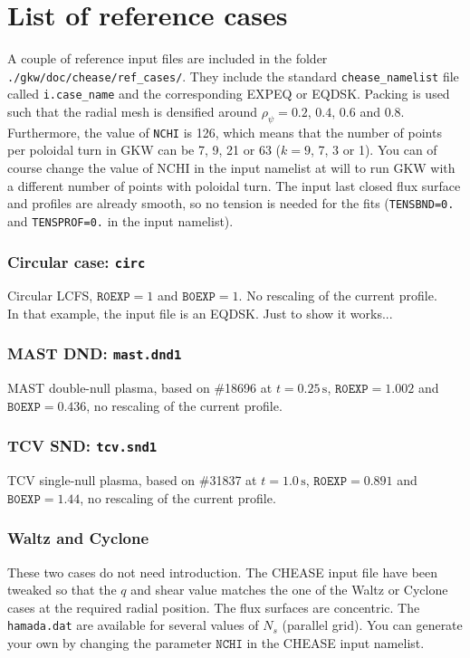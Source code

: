 \documentclass[a4paper,12pt]{article}
\begin{document}
\part*{List of reference cases}
A couple of reference input files are included in the folder \texttt{./gkw/doc/chease/ref\_cases/}. They include the standard \texttt{chease\_namelist} file called \texttt{i.case\_name} and the corresponding EXPEQ or EQDSK. Packing is used such that the radial mesh is densified around $\rho_\psi=0.2$, $0.4$, $0.6$ and $0.8$. Furthermore, the value of \texttt{NCHI} is 126, which means that the number of points per poloidal turn in GKW can be 7, 9, 21 or 63 ($k=9$, 7, 3 or 1). You can of course change the value of NCHI in the input namelist at will to run GKW with a different number of points with poloidal turn. The input last closed flux surface and profiles are already smooth, so no tension is needed for the fits (\texttt{TENSBND=0.} and \texttt{TENSPROF=0.} in the input namelist).

\section{Circular case: \texttt{circ}}
Circular LCFS, $\texttt{R0EXP}=1$ and $\texttt{B0EXP}=1$. No rescaling of the current profile.\\
In that example, the input file is an EQDSK. Just to show it works...

\section{MAST DND: \texttt{mast.dnd1}}
MAST double-null plasma, based on \#18696 at $t=0.25\,\textrm{s}$, $\texttt{R0EXP}=1.002$ and $\texttt{B0EXP}=0.436$, no rescaling of the current profile.

\section{TCV SND: \texttt{tcv.snd1}}
TCV single-null plasma, based on \#31837 at $t=1.0\,\textrm{s}$, $\texttt{R0EXP}=0.891$ and $\texttt{B0EXP}=1.44$, no rescaling of the current profile.

\section{Waltz and Cyclone}
These two cases do not need introduction. The CHEASE input file have been tweaked so that the $q$ and shear value matches the one of the Waltz or Cyclone cases at the required radial position. The
flux surfaces are concentric. The \texttt{hamada.dat} are available for several values of $N_s$ (parallel grid). You can generate your own by changing the parameter $\texttt{NCHI}$ in the CHEASE input namelist.




\end{document}
